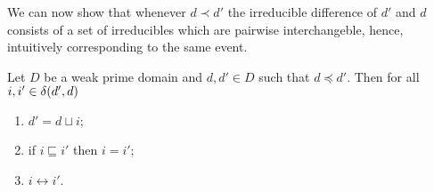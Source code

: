 We can now  show that whenever $d \prec d'$ the
irreducible difference of $d'$ and $d$ consists of a set of
irreducibles which are pairwise interchangeble, hence, intuitively corresponding to the same event.

\begin{lemma}
  \label{le:prec-irr-b}
  Let $D$ be a weak prime domain and $d, d' \in D$ such that $d \preceq d'$.
  Then for all $i,i' \in \delta({d'},{d})$ 
  \begin{enumerate}
  \item  
    \label{le:prec-irr-b:1}
    $d' = d \sqcup i$;

  \item  
    \label{le:prec-irr-b:1bis}
    if $i \sqsubseteq i'$ then $i=i'$;


  \item  
    \label{le:prec-irr-b:3}
    $i \leftrightarrow i'$.
  \end{enumerate}
\end{lemma}

